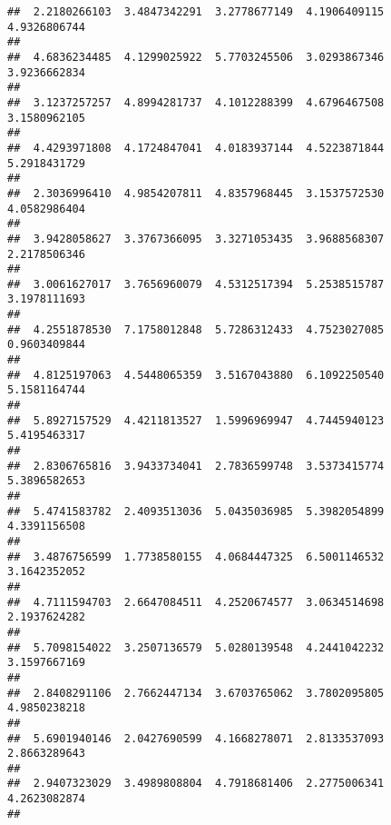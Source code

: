 \documentclass[]{article}
\begin{document}
\begin{verbatim}
##  2.2180266103  3.4847342291  3.2778677149  4.1906409115  4.9326806744 
##                                                                       
##  4.6836234485  4.1299025922  5.7703245506  3.0293867346  3.9236662834 
##                                                                       
##  3.1237257257  4.8994281737  4.1012288399  4.6796467508  3.1580962105 
##                                                                       
##  4.4293971808  4.1724847041  4.0183937144  4.5223871844  5.2918431729 
##                                                                       
##  2.3036996410  4.9854207811  4.8357968445  3.1537572530  4.0582986404 
##                                                                       
##  3.9428058627  3.3767366095  3.3271053435  3.9688568307  2.2178506346 
##                                                                       
##  3.0061627017  3.7656960079  4.5312517394  5.2538515787  3.1978111693 
##                                                                       
##  4.2551878530  7.1758012848  5.7286312433  4.7523027085  0.9603409844 
##                                                                       
##  4.8125197063  4.5448065359  3.5167043880  6.1092250540  5.1581164744 
##                                                                       
##  5.8927157529  4.4211813527  1.5996969947  4.7445940123  5.4195463317 
##                                                                       
##  2.8306765816  3.9433734041  2.7836599748  3.5373415774  5.3896582653 
##                                                                       
##  5.4741583782  2.4093513036  5.0435036985  5.3982054899  4.3391156508 
##                                                                       
##  3.4876756599  1.7738580155  4.0684447325  6.5001146532  3.1642352052 
##                                                                       
##  4.7111594703  2.6647084511  4.2520674577  3.0634514698  2.1937624282 
##                                                                       
##  5.7098154022  3.2507136579  5.0280139548  4.2441042232  3.1597667169 
##                                                                       
##  2.8408291106  2.7662447134  3.6703765062  3.7802095805  4.9850238218 
##                                                                       
##  5.6901940146  2.0427690599  4.1668278071  2.8133537093  2.8663289643 
##                                                                       
##  2.9407323029  3.4989808804  4.7918681406  2.2775006341  4.2623082874 
##                                                                       

\end{verbatim}
\end{document}
